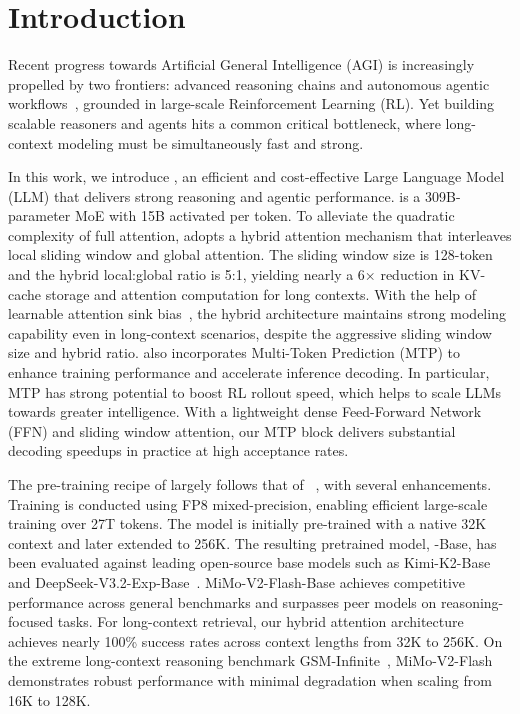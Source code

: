 \section{Introduction}


Recent progress towards Artificial General Intelligence (AGI) is increasingly propelled by two frontiers: advanced reasoning chains and autonomous agentic workflows~\citep{gemini3pro,liu2025deepseek,team2025kimi}, grounded in large-scale Reinforcement Learning (RL).
Yet building scalable reasoners and agents hits a common critical bottleneck, where long-context modeling must be simultaneously fast and strong.

In this work, we introduce \mimoflash{}, an efficient and cost-effective Large Language Model (LLM) that delivers strong reasoning and agentic performance.
\mimoflash{} is a 309B-parameter MoE with 15B activated per token. 
To alleviate the quadratic complexity of full attention, \mimoflash{} adopts a hybrid attention mechanism that interleaves local sliding window and global attention. The sliding window size is 128-token and the hybrid local:global ratio is 5:1, yielding nearly a 6× reduction in KV-cache storage and attention computation for long contexts.
With the help of learnable attention sink bias~\citep{agarwal2025gpt}, the hybrid architecture maintains strong modeling capability even in long-context scenarios, despite the aggressive sliding window size and hybrid ratio.
\mimoflash{} also incorporates Multi-Token Prediction (MTP) to enhance training performance and accelerate inference decoding. In particular, MTP has strong potential to boost RL rollout speed, which helps to scale LLMs towards greater intelligence. 
With a lightweight dense Feed-Forward Network (FFN) and sliding window attention, our MTP block delivers substantial decoding speedups in practice at high acceptance rates.


The pre-training recipe of \mimoflash{} largely follows that of \mimo{}~\citep{xia2025mimo}, with several enhancements. Training is conducted using FP8 mixed-precision, enabling efficient large-scale training over 27T tokens. The model is initially pre-trained with a native 32K context and later extended to 256K. The resulting pretrained model, \mimoflash{}-Base, has been evaluated against leading open-source base models such as Kimi-K2-Base~\citep{team2025kimik2} and DeepSeek-V3.2-Exp-Base~\citep{liu2025deepseek}. 
MiMo-V2-Flash-Base achieves competitive performance across general benchmarks and surpasses peer models on reasoning-focused tasks.
For long-context retrieval, our hybrid attention architecture achieves nearly 100\% success rates across context lengths from 32K to 256K. On the extreme long-context reasoning benchmark GSM-Infinite~\citep{zhou2025gsm}, MiMo-V2-Flash demonstrates robust performance with minimal degradation when scaling from 16K to 128K.

